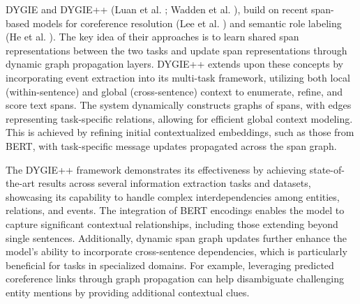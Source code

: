 DYGIE and DYGIE++ (Luan et al. \cite{luan-etal-2019-general}; Wadden et al. \cite{Wadden2019EntityRA}), build on recent span-based models for coreference resolution (Lee et al. \cite{lee-etal-2017-end}) and semantic role labeling (He et al. \cite{he-etal-2018-jointly}). The key idea of their approaches is to learn shared span representations between the two tasks and update span representations through dynamic graph propagation layers.  DYGIE++ extends upon these concepts by incorporating event extraction into its multi-task framework, utilizing both local (within-sentence) and global (cross-sentence) context to enumerate, refine, and score text spans. The system dynamically constructs graphs of spans, with edges representing task-specific relations, allowing for efficient global context modeling. This is achieved by refining initial contextualized embeddings, such as those from BERT, with task-specific message updates propagated across the span graph.

The DYGIE++ framework demonstrates its effectiveness by achieving state-of-the-art results across several information extraction tasks and datasets, showcasing its capability to handle complex interdependencies among entities, relations, and events. The integration of BERT encodings enables the model to capture significant contextual relationships, including those extending beyond single sentences. Additionally, dynamic span graph updates further enhance the model's ability to incorporate cross-sentence dependencies, which is particularly beneficial for tasks in specialized domains. For example, leveraging predicted coreference links through graph propagation can help disambiguate challenging entity mentions by providing additional contextual clues.

